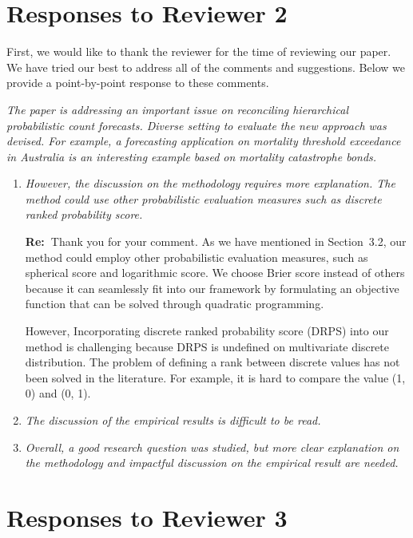 \documentclass[11pt,a4paper]{article}
\newcommand{\RE}[2][Re:~]{{\color{blue}\textbf{#1}#2}}
\begin{document}
\section*{Responses to Reviewer 2}\label{reviewer-2-comments}

\RE[]{First, we would like to thank the reviewer for the time of reviewing our paper. We have tried our best to address all of the comments and suggestions. Below we provide a point-by-point response to these comments.}

\textit{The paper is addressing an important issue on reconciling hierarchical probabilistic count forecasts. Diverse setting to evaluate the new approach was devised. For example, a forecasting application on mortality threshold exceedance in Australia is an interesting example based on mortality catastrophe bonds.}

\begin{enumerate}
    \item \textit{However, the discussion on the methodology requires more explanation. The method could use other probabilistic evaluation measures such as discrete ranked probability score.}
   
    \RE{Thank you for your comment. As we have mentioned in Section~3.2, our method could employ other probabilistic evaluation measures, such as spherical score and logarithmic score. We choose Brier score instead of others because it can seamlessly fit into our framework by formulating an objective function that can be solved through quadratic programming.
    
    However, Incorporating discrete ranked probability score (DRPS) into our method is challenging because DRPS is undefined on multivariate discrete distribution. The problem of defining a rank between discrete values has not been solved in the literature. For example, it is hard to compare the value (1, 0) and (0, 1).
    }

    \item \textit{The discussion of the empirical results is difficult to be read.}
    \item \textit{Overall, a good research question was studied, but more clear explanation on the methodology and impactful discussion on the empirical result are needed.}
\end{enumerate}




\newpage
\section*{Responses to Reviewer 3}\label{reviewer-3-comments}
\end{document}
